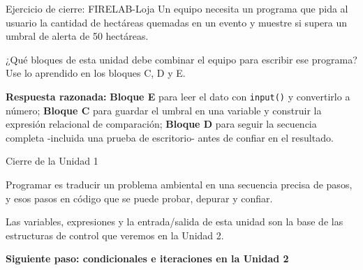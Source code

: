 \documentclass[aspectratio=169,11pt]{beamer}
\begin{document}
\begin{frame}{Ejercicio de cierre: FIRELAB-Loja}
\small
Un equipo necesita un programa que pida al usuario la cantidad de hectáreas quemadas en un evento y muestre si supera un umbral de alerta de 50 hectáreas.
\vspace{0.1cm}
\begin{checkbox}
¿Qué bloques de esta unidad debe combinar el equipo para escribir ese programa? Use lo aprendido en los bloques C, D y E.
\end{checkbox}
\vspace{0.15cm}
\begin{keybox}[top=2pt,bottom=2pt]
\footnotesize\textbf{Respuesta razonada:} \textbf{Bloque E} para leer el dato con \texttt{input()} y convertirlo a número; \textbf{Bloque C} para guardar el umbral en una variable y construir la expresión relacional de comparación; \textbf{Bloque D} para seguir la secuencia completa -incluida una prueba de escritorio- antes de confiar en el resultado.
\end{keybox}
\end{frame}

\begin{frame}{Cierre de la Unidad 1}
\begin{keybox}[top=2pt,bottom=2pt]
\footnotesize Programar es traducir un problema ambiental en una secuencia precisa de pasos, y esos pasos en código que se puede probar, depurar y confiar.
\end{keybox}
\begin{keybox}[top=2pt,bottom=2pt]
\footnotesize Las variables, expresiones y la entrada/salida de esta unidad son la base de las estructuras de control que veremos en la Unidad 2.
\end{keybox}
\vspace{0.1cm}
\begin{center}
\Large\textbf{Siguiente paso: condicionales e iteraciones en la Unidad 2}
\end{center}
\end{frame}
\end{document}
